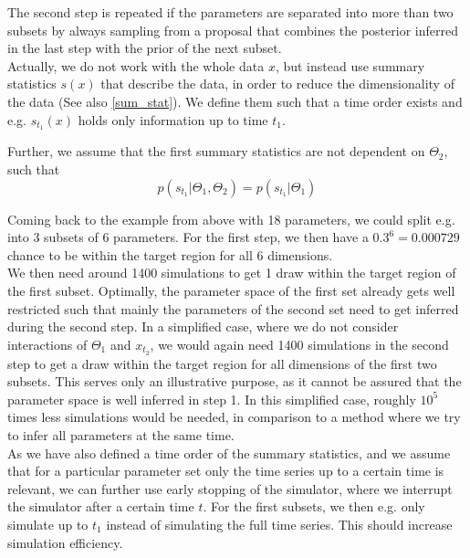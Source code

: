 \documentclass[12pt]{extreport}
\begin{document}
The second step is repeated if the parameters are separated into more than two subsets by always sampling from a proposal that combines the posterior inferred in the last step with the prior of the next subset.\\

Actually, we do not work with the whole data $x$, but instead use summary statistics $s(x)$ that describe the data, in order to reduce the dimensionality of the data (See also \ref{sum_stat}). We define them such that a time order exists and e.g. $s_{t_1}(x)$ holds only information up to time $t_1$.

Further, we assume that the first summary statistics are not dependent on $\Theta_2$, such that 
\begin{equation}
\label{prop33}
p(s_{t_1} |\Theta_1, \Theta_2) = p(s_{t_1} |\Theta_1) 
\end{equation}

Coming back to the example from above with 18 parameters, we could split e.g. into 3 subsets of 6 parameters. For the first step, we then have a $0.3^6  = 0.000729$ chance to be within the target region for all 6 dimensions. \\
We then need around 1400 simulations to get 1 draw within the target region of the first subset. Optimally, the parameter space of the first set already gets well restricted such that mainly the parameters of the second set need to get inferred during the second step. In a simplified case, where we do not consider interactions of $\Theta_1$ and $x_{t_2}$, we would again need 1400 simulations in the second step to get a draw within the target region for all dimensions of the first two subsets. This serves only an illustrative purpose, as it cannot be assured that the parameter space is well inferred in step 1. In this simplified case, roughly $10^5$ times less simulations would be needed, in comparison to a method where we try to infer all parameters at the same time. \\

As we have also defined a time order of the summary statistics, and we assume that for a particular parameter set only the time series up to a certain time is relevant, we can further use early stopping of the simulator, where we interrupt the simulator after a certain time $t$. For the first subsets, we then e.g. only simulate up to $t_1$ instead of simulating the full time series. This should increase simulation efficiency. \\
\end{document}
